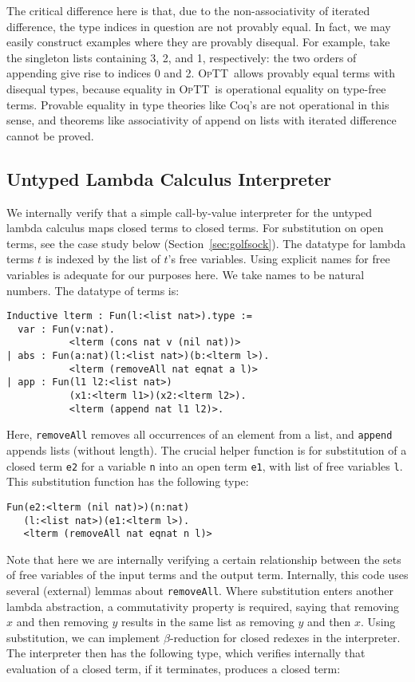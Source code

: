 \documentclass[preprint,natbib]{sigplanconf}
\newcommand{\optt}{\textsc{OpTT}}
\begin{document}
\noindent The critical difference here is that, due to the
non-associativity of iterated difference, the type indices in question
are not provably equal.  In fact, we may easily construct examples
where they are provably disequal.  For example, take the singleton
lists containing 3, 2, and 1, respectively: the two orders of
appending give rise to indices 0 and 2.  \optt\ allows provably equal
terms with disequal types, because equality in \optt\ is operational
equality on type-free terms.  Provable equality in type theories like
Coq's are not operational in this sense, and theorems like
associativity of append on lists with iterated difference cannot be
proved.

\subsection{Untyped Lambda Calculus Interpreter} 

We internally verify that a simple call-by-value interpreter for the
untyped lambda calculus maps closed terms to closed terms.  For
substitution on open terms, see the case study below
(Section~\ref{sec:golfsock}).  The datatype for lambda terms $t$ is
indexed by the list of $t$'s free variables.  Using explicit names for
free variables is adequate for our purposes here.  We take names to be
natural numbers.  The datatype of terms is:

\begin{verbatim}
Inductive lterm : Fun(l:<list nat>).type :=
  var : Fun(v:nat).
           <lterm (cons nat v (nil nat))>
| abs : Fun(a:nat)(l:<list nat>)(b:<lterm l>).
           <lterm (removeAll nat eqnat a l)>
| app : Fun(l1 l2:<list nat>)
           (x1:<lterm l1>)(x2:<lterm l2>).
           <lterm (append nat l1 l2)>.
\end{verbatim}

\noindent Here, \texttt{removeAll} removes all occurrences of an
element from a list, and \texttt{append} appends lists (without
length).  The crucial helper function is for substitution of a closed
term \texttt{e2} for a variable \texttt{n} into an open term
\texttt{e1}, with list of free variables \texttt{l}.  This
substitution function has the following type:

\begin{verbatim}
Fun(e2:<lterm (nil nat)>)(n:nat)
   (l:<list nat>)(e1:<lterm l>).
   <lterm (removeAll nat eqnat n l)>
\end{verbatim}

\noindent Note that here we are internally verifying a certain
relationship between the sets of free variables of the input terms and
the output term.  Internally, this code uses several (external) lemmas
about \texttt{removeAll}.  Where substitution enters another lambda
abstraction, a commutativity property is required, saying that
removing $x$ and then removing $y$ results in the same list as
removing $y$ and then $x$.  Using substitution, we can implement
$\beta$-reduction for closed redexes in the interpreter.  The
interpreter then has the following type, which verifies internally
that evaluation of a closed term, if it terminates, produces a closed
term:
\end{document}
